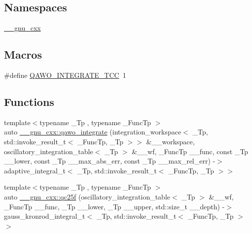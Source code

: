 \subsection*{Namespaces}
\begin{DoxyCompactItemize}
\item 
 \hyperlink{namespace____gnu__cxx}{\+\_\+\+\_\+gnu\+\_\+cxx}
\end{DoxyCompactItemize}
\subsection*{Macros}
\begin{DoxyCompactItemize}
\item 
\#define \hyperlink{qawo__integrate_8tcc_a0b8e2cb4be917d8339d84306b7bd02c3}{Q\+A\+W\+O\+\_\+\+I\+N\+T\+E\+G\+R\+A\+T\+E\+\_\+\+T\+CC}~1
\end{DoxyCompactItemize}
\subsection*{Functions}
\begin{DoxyCompactItemize}
\item 
{\footnotesize template$<$typename \+\_\+\+Tp , typename \+\_\+\+Func\+Tp $>$ }\\auto \hyperlink{namespace____gnu__cxx_ab0bb39b227f5cc4a68ce5a8d404f88b6}{\+\_\+\+\_\+gnu\+\_\+cxx\+::qawo\+\_\+integrate} (integration\+\_\+workspace$<$ \+\_\+\+Tp, std\+::invoke\+\_\+result\+\_\+t$<$ \+\_\+\+Func\+Tp, \+\_\+\+Tp $>$$>$ \&\+\_\+\+\_\+workspace, oscillatory\+\_\+integration\+\_\+table$<$ \+\_\+\+Tp $>$ \&\+\_\+\+\_\+wf, \+\_\+\+Func\+Tp \+\_\+\+\_\+func, const \+\_\+\+Tp \+\_\+\+\_\+lower, const \+\_\+\+Tp \+\_\+\+\_\+max\+\_\+abs\+\_\+err, const \+\_\+\+Tp \+\_\+\+\_\+max\+\_\+rel\+\_\+err) -\/$>$ adaptive\+\_\+integral\+\_\+t$<$ \+\_\+\+Tp, std\+::invoke\+\_\+result\+\_\+t$<$ \+\_\+\+Func\+Tp, \+\_\+\+Tp $>$$>$
\item 
{\footnotesize template$<$typename \+\_\+\+Tp , typename \+\_\+\+Func\+Tp $>$ }\\auto \hyperlink{namespace____gnu__cxx_a1362a6c4ef82cf1afe4de6bc66fb56b6}{\+\_\+\+\_\+gnu\+\_\+cxx\+::qc25f} (oscillatory\+\_\+integration\+\_\+table$<$ \+\_\+\+Tp $>$ \&\+\_\+\+\_\+wf, \+\_\+\+Func\+Tp \+\_\+\+\_\+func, \+\_\+\+Tp \+\_\+\+\_\+lower, \+\_\+\+Tp \+\_\+\+\_\+upper, std\+::size\+\_\+t \+\_\+\+\_\+depth) -\/$>$ gauss\+\_\+kronrod\+\_\+integral\+\_\+t$<$ \+\_\+\+Tp, std\+::invoke\+\_\+result\+\_\+t$<$ \+\_\+\+Func\+Tp, \+\_\+\+Tp $>$$>$
\end{DoxyCompactItemize}


